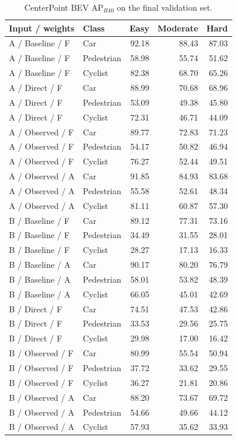 \begin{table}[!t]\centering
\begin{tabular}{llrrr}\toprule
Input / weights & Class & Easy & Moderate & Hard\\\midrule
A / Baseline / F & Car & 92.18 & 88.43 & 87.03 \\
A / Baseline / F & Pedestrian & 58.98 & 55.74 & 51.62 \\
A / Baseline / F & Cyclist & 82.38 & 68.70 & 65.26 \\
A / Direct / F & Car & 88.99 & 70.68 & 68.96 \\
A / Direct / F & Pedestrian & 53.09 & 49.38 & 45.80 \\
A / Direct / F & Cyclist & 72.31 & 46.71 & 44.09 \\
A / Observed / F & Car & 89.77 & 72.83 & 71.23 \\
A / Observed / F & Pedestrian & 54.17 & 50.82 & 46.94 \\
A / Observed / F & Cyclist & 76.27 & 52.44 & 49.51 \\
A / Observed / A & Car & 91.85 & 84.93 & 83.68 \\
A / Observed / A & Pedestrian & 55.58 & 52.61 & 48.34 \\
A / Observed / A & Cyclist & 81.11 & 60.87 & 57.30 \\
B / Baseline / F & Car & 89.12 & 77.31 & 73.16 \\
B / Baseline / F & Pedestrian & 34.49 & 31.55 & 28.01 \\
B / Baseline / F & Cyclist & 28.27 & 17.13 & 16.33 \\
B / Baseline / A & Car & 90.17 & 80.20 & 76.79 \\
B / Baseline / A & Pedestrian & 58.01 & 53.82 & 48.39 \\
B / Baseline / A & Cyclist & 66.05 & 45.01 & 42.69 \\
B / Direct / F & Car & 74.51 & 47.53 & 42.86 \\
B / Direct / F & Pedestrian & 33.53 & 29.56 & 25.75 \\
B / Direct / F & Cyclist & 29.98 & 17.00 & 16.42 \\
B / Observed / F & Car & 80.99 & 55.54 & 50.94 \\
B / Observed / F & Pedestrian & 37.72 & 33.62 & 29.55 \\
B / Observed / F & Cyclist & 36.27 & 21.81 & 20.86 \\
B / Observed / A & Car & 88.20 & 73.67 & 69.72 \\
B / Observed / A & Pedestrian & 54.66 & 49.66 & 44.12 \\
B / Observed / A & Cyclist & 57.93 & 35.62 & 33.93 \\
\bottomrule\end{tabular}
\caption{CenterPoint BEV AP$_{R40}$ on the final validation set.}\label{tab:cp-bev-full}
\end{table}

